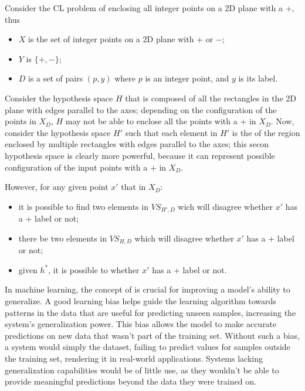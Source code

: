 \documentclass[a4paper, 12pt]{report}
\begin{document}
    \begin{example}
        Consider the CL problem of enclosing all integer points on a 2D plane  with a +, thus

        \begin{itemize}
            \item $X$ is the set of integer points on a 2D plane  with + or $-$;
            \item $Y$ is $\{+,-\}$;
            \item $D$ is a set of pairs $(p, y)$ where $p$ is an integer point, and $y$ is its label.
        \end{itemize}

        Consider the hypothesis space $H$ that is composed of all the rectangles in the 2D plane with edges parallel to the axes; depending on the configuration of the points in $X_D$, $H$ may not be able to enclose all the points with a + in $X_D$. Now, consider the hypothesis space $H'$ such that each element in $H'$ is the  of the region enclosed by multiple rectangles with edges parallel to the axes; this secon hypothesis space is clearly more powerful, because it can represent  possible configuration of the input points with a  + in $X_D$.

        However, for any given point $x'$ that  in $X_D$:

        \begin{itemize}
            \item it is  possible to find two elements in $VS_{H', D}$ wich will disagree whether $x'$ has a + label or not;
            \item there  be two elements in $VS_{H, D}$ which will disagree whether $x'$ has a + label or not;
            \item given $h^*$, it is  possible to  whether $x'$ has a + label or not.
        \end{itemize}
    \end{example}

    In machine learning, the concept of  is crucial for improving a model's ability to generalize. A good learning bias helps guide the learning algorithm towards patterns in the data that are useful for predicting unseen samples, increasing the system's generalization power. This bias allows the model to make accurate predictions on new data that wasn't part of the training set. Without such a bias, a system would simply  the dataset, failing to predict values for samples outside the training set, rendering it  in real-world applications. Systems lacking generalization capabilities would be of little use, as they wouldn't be able to provide meaningful predictions beyond the data they were trained on.
\end{document}
